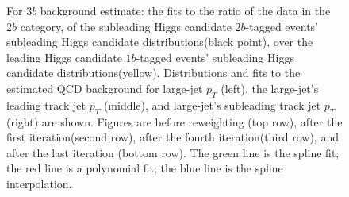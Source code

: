 \begin{figure}[htbp!]
\begin{center}
\caption{For $3b$ background estimate: the fits to the ratio of the data in the $2b$ category, of the subleading Higgs candidate $2b$-tagged events' subleading Higgs candidate distributions(black point), over the leading Higgs candidate $1b$-tagged events' subleading Higgs candidate distributions(yellow). Distributions and fits to the estimated QCD background for large-\R jet $p_{T}$ (left),  the large-\R jet's leading track jet $p_T$ (middle), and large-\R jet's subleading track jet $p_T$ (right) are shown.  Figures are before reweighting (top row), after the first iteration(second row), after the fourth iteration(third row), and after the last iteration (bottom row). The green line is the spline fit; the red line is a polynomial fit; the blue line is the spline interpolation.}
\label{fig:rw-3b-lead}
\end{center}
\end{figure}

